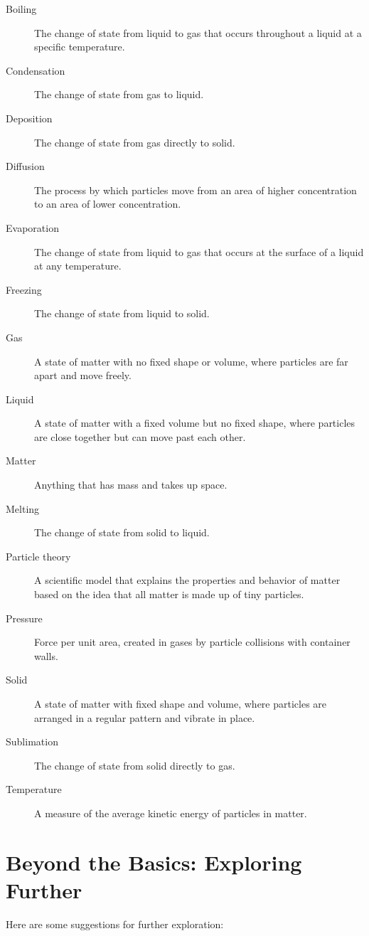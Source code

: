 \begin{description}
    \item[Boiling] The change of state from liquid to gas that occurs throughout a liquid at a specific temperature.
    \item[Condensation] The change of state from gas to liquid.
    \item[Deposition] The change of state from gas directly to solid.
    \item[Diffusion] The process by which particles move from an area of higher concentration to an area of lower concentration.
    \item[Evaporation] The change of state from liquid to gas that occurs at the surface of a liquid at any temperature.
    \item[Freezing] The change of state from liquid to solid.
    \item[Gas] A state of matter with no fixed shape or volume, where particles are far apart and move freely.
    \item[Liquid] A state of matter with a fixed volume but no fixed shape, where particles are close together but can move past each other.
    \item[Matter] Anything that has mass and takes up space.
    \item[Melting] The change of state from solid to liquid.
    \item[Particle theory] A scientific model that explains the properties and behavior of matter based on the idea that all matter is made up of tiny particles.
    \item[Pressure] Force per unit area, created in gases by particle collisions with container walls.
    \item[Solid] A state of matter with fixed shape and volume, where particles are arranged in a regular pattern and vibrate in place.
    \item[Sublimation] The change of state from solid directly to gas.
    \item[Temperature] A measure of the average kinetic energy of particles in matter.
\end{description}

\section{Beyond the Basics: Exploring Further}

 Here are some suggestions for further exploration:

